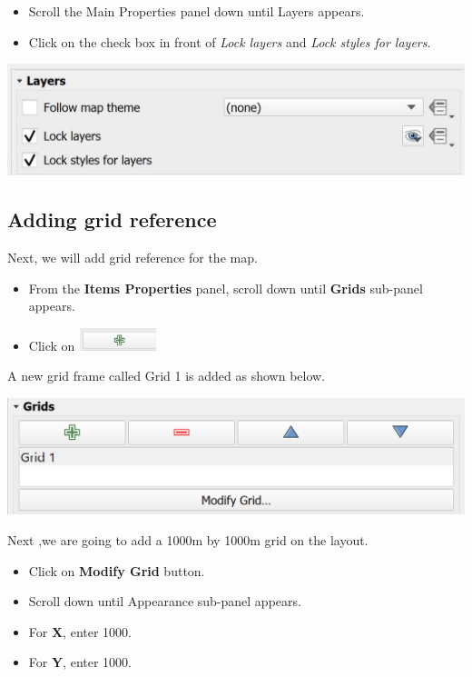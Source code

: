 \documentclass[
  letterpaper,
  DIV=11,
  numbers=noendperiod]{scrreprt}
\providecommand{\tightlist}{%
  \setlength{\itemsep}{0pt}\setlength{\parskip}{0pt}}\usepackage{longtable,booktabs,array}
\begin{document}
\begin{itemize}
\tightlist
\item
  Scroll the Main Properties panel down until Layers appears.
\item
  Click on the check box in front of \emph{Lock layers} and \emph{Lock
  styles for layers}.
\end{itemize}

\includegraphics{./img04/image51.jpg}

\hypertarget{adding-grid-reference}{%
\subsection{Adding grid reference}\label{adding-grid-reference}}

Next, we will add grid reference for the map.

\begin{itemize}
\item
  From the \textbf{Items Properties} panel, scroll down until
  \textbf{Grids} sub-panel appears.
\item
  Click on
  \includegraphics[width=0.88542in,height=0.26042in]{./img04/image52.jpg}
\end{itemize}

A new grid frame called Grid 1 is added as shown below.

\includegraphics{./images/paste-FE1E269B.png}

Next ,we are going to add a 1000m by 1000m grid on the layout.

\begin{itemize}
\item
  Click on \textbf{Modify Grid} button.
\item
  Scroll down until Appearance sub-panel appears.
\item
  For \textbf{X}, enter 1000.
\item
  For \textbf{Y}, enter 1000.
\end{itemize}
\end{document}
